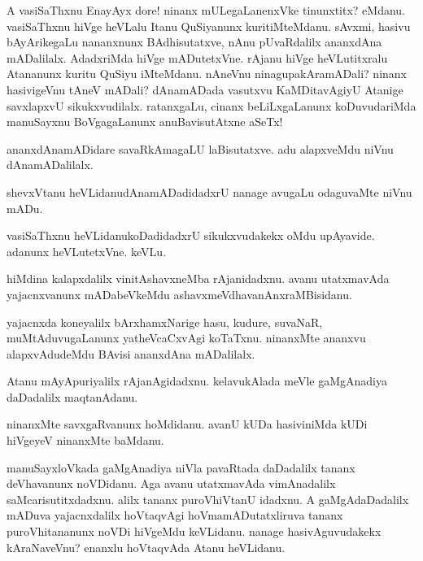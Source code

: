 \begin{mng}
A vasiSaThxnu EnayAyx dore! ninanx mULegaLanenxVke tinunxtitx? eMdanu. vasiSaThxnu hiVge heVLalu Itanu QuSiyanunx kuritiMteMdanu. sAvxmi, hasivu bAyArikegaLu nananxnunx BAdhisutatxve, nAnu pUvaRdalilx ananxdAna mADalilalx. AdadxriMda hiVge mADutetxVne. rAjanu hiVge heVLutitxralu Atananunx kuritu QuSiyu iMteMdanu. nAneVnu ninagupakAramADali? ninanx hasivigeVnu tAneV mADali? dAnamADada vasutxvu KaMDitavAgiyU Atanige savxlapxvU sikukxvudilalx. ratanxgaLu, cinanx beLiLxgaLanunx koDuvudariMda manuSayxnu BoVgagaLanunx anuBavisutAtxne aSeTx!
\end{mng}

\begin{mng}
ananxdAnamADidare savaRkAmagaLU laBisutatxve. adu alapxveMdu niVnu dAnamADalilalx.
\end{mng}

\begin{mng}
shevxVtanu heVLidanu\mdash dAnamADadidadxrU nanage avugaLu odaguvaMte niVnu mADu.
\end{mng}

\begin{mng}
vasiSaThxnu heVLidanu\mdash koDadidadxrU sikukxvudakekx oMdu upAyavide. adanunx heVLutetxVne. keVLu.
\end{mng}

\begin{mng}
hiMdina kalapxdalilx vinitAshavxneMba rAjanidadxnu. avanu utatxmavAda yajacnxvanunx mADabeVkeMdu ashavxmeVdhavanAnxraMBisidanu.
\end{mng}

\begin{mng}
yajacnxda koneyalilx bArxhamxNarige hasu, kudure, suvaNaR, muMtAduvugaLanunx yatheVcaCxvAgi koTaTxnu. ninanxMte ananxvu alapxvAdudeMdu BAvisi ananxdAna mADalilalx.
\end{mng}

\begin{mng}
Atanu mAyApuriyalilx rAjanAgidadxnu. kelavukAlada meVle gaMgAnadiya daDadalilx maqtanAdanu.
\end{mng}

\begin{mng}
ninanxMte savxgaRvanunx hoMdidanu. avanU kUDa hasiviniMda kUDi hiVgeyeV ninanxMte baMdanu.
\end{mng}

\begin{mng}
manuSayxloVkada gaMgAnadiya niVla pavaRtada daDadalilx tananx deVhavanunx noVDidanu. Aga avanu utatxmavAda vimAnadalilx saMcarisutitxdadxnu. alilx tananx puroVhiVtanU idadxnu. A gaMgAdaDadalilx mADuva yajacnxdalilx hoVtaqvAgi hoVmamADutatxliruva tananx puroVhitananunx noVDi hiVgeMdu keVLidanu. nanage hasivAguvudakekx kAraNaveVnu? enanxlu hoVtaqvAda Atanu heVLidanu.
\end{mng}

